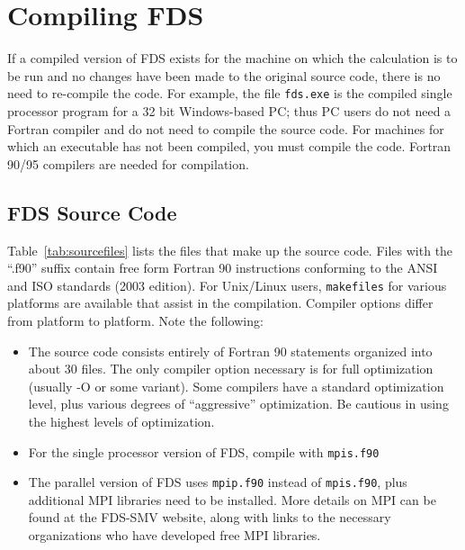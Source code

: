 \documentclass[11pt]{book}
\newcommand{\ct}{\tt\small}
\begin{document}
\chapter{Compiling FDS}
\label{info:compilation}

If a compiled version of FDS exists for the machine on which the
calculation is to be run and no changes have been made to
the original source code, there is no need to re-compile the code.
For example, the file {\ct fds.exe} is the
compiled single processor program for a 32 bit Windows-based PC;
thus PC users do not need a
Fortran compiler and do not need to compile the source code.
For machines for which an executable has not been compiled, you must
compile the code. Fortran 90/95 compilers are needed for compilation.

\section{FDS Source Code}

Table~\ref{tab:sourcefiles} lists the files that make up the source code.
Files with the ``.f90'' suffix contain free form Fortran 90 instructions
conforming to the ANSI and ISO standards (2003 edition).
For Unix/Linux users, {\ct makefiles} for various platforms are available
that assist in the compilation. Compiler options differ from platform to platform.
Note the following:
\begin{itemize}
\item The source code consists entirely of Fortran 90
statements organized into about 30 files.
The only compiler option necessary is for full optimization (usually -O or some variant). Some
compilers have a standard optimization level, plus various degrees of
``aggressive'' optimization. Be cautious in using the highest levels of optimization.
\item For the single processor version of FDS, compile with {\ct mpis.f90}
\item The parallel version of FDS uses {\ct mpip.f90} instead of
{\ct mpis.f90}, plus additional MPI libraries need to be installed. More
details on MPI can be found at the FDS-SMV website, along with links to the
necessary organizations who have developed free MPI libraries.
\end{itemize}
\end{document}
